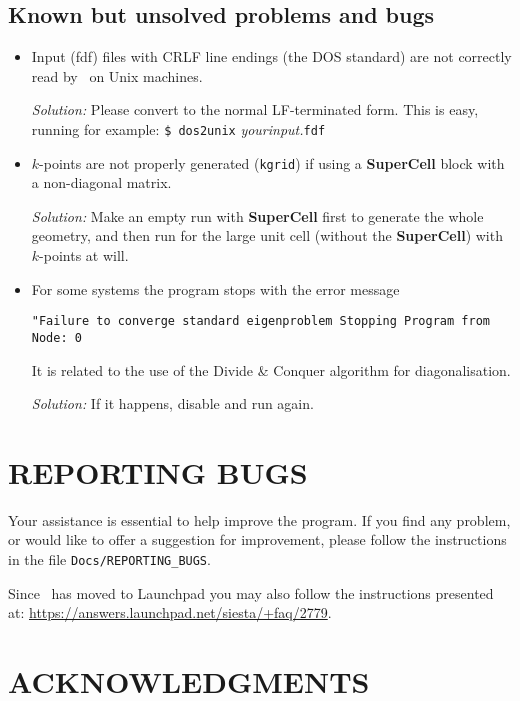 \subsection{Known but unsolved problems and bugs}

\begin{itemize}

\item
Input (fdf) files with CRLF line endings (the DOS standard) are not
correctly read by \siesta\ on Unix machines.

\textit{Solution:} Please convert to the normal LF-terminated form. This
is easy, running for example: \texttt{\$ dos2unix} \textit{yourinput.}\texttt{fdf}

\item
$k$-points are not properly generated (\texttt{kgrid}) if using a
\textbf{SuperCell} block with a non-diagonal matrix.

\textit{Solution:} Make an empty run with \textbf{SuperCell} first to generate
the whole geometry, and then run for the large unit cell (without the
\textbf{SuperCell}) with $k$-points at will.

\item
For some systems the program stops with the error message

\texttt{"Failure to converge standard eigenproblem
Stopping Program from Node:    0}

It is related to the use of the Divide \& Conquer algorithm for
diagonalisation.

\textit{Solution:} If it happens, disable  and run again.

\end{itemize}


\section{REPORTING BUGS}

Your assistance is essential to help improve the program. If you find
any problem, or would like to offer a suggestion for improvement,
please follow the instructions in the file
\texttt{Docs/REPORTING\_BUGS}. 

Since \siesta\ has moved to Launchpad you may also follow the
instructions presented at:
\url{https://answers.launchpad.net/siesta/+faq/2779}. 



\section{ACKNOWLEDGMENTS}

